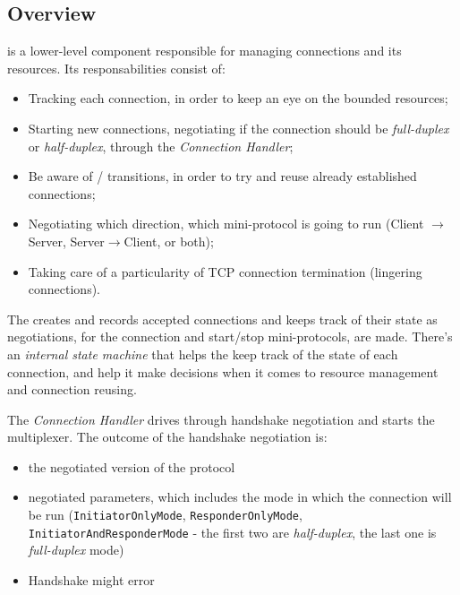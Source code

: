 \subsection{Overview}

\Connmngr{} is a lower-level component responsible for managing connections and its
resources. Its responsabilities consist of:

\begin{itemize}
    \item Tracking each connection, in order to keep an eye on the bounded resources;
    \item Starting new connections, negotiating if the connection should be
      \emph{full-duplex} or \emph{half-duplex}, through the \emph{Connection Handler};
    \item Be aware of \warm{}/\hot{} transitions, in order to try and reuse already established
      connections;
    \item Negotiating which direction, which mini-protocol is going to run
      (Client $\rightarrow$ Server, Server$\rightarrow$Client, or both);
    \item Taking care of a particularity of TCP connection termination (lingering
      connections).
\end{itemize}

The \Connmngr{} creates and records accepted connections and keeps track of their state
as negotiations, for the connection and start/stop mini-protocols, are made. There's an
\emph{internal state machine} that helps the \Connmngr{} keep track of the state of each
connection, and help it make decisions when it comes to resource management and
connection reusing.

The \emph{Connection Handler} drives through handshake negotiation and starts the multiplexer. The
outcome of the handshake negotiation is:

\begin{itemize}
    \item the negotiated version of the protocol
    \item negotiated parameters, which includes the mode in which the connection will be
      run (\texttt{InitiatorOnlyMode}, \texttt{ResponderOnlyMode},\\
      \texttt{InitiatorAndResponderMode} - the first two are \emph{half-duplex}, the last
      one is \emph{full-duplex} mode)
    \item Handshake might error
\end{itemize}


